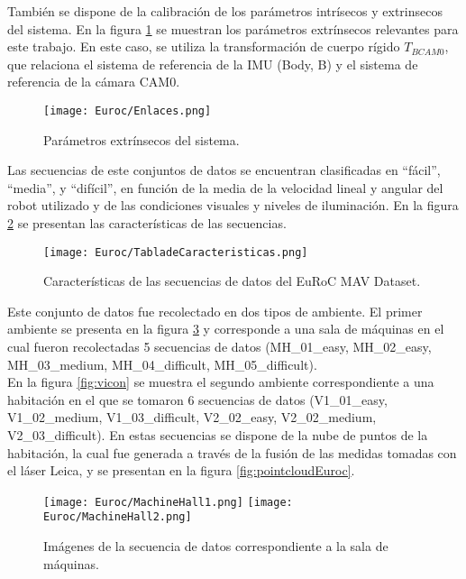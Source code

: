 También se dispone de la calibración de los parámetros intrísecos y extrinsecos del sistema. En la figura \ref{fig:extrinsecosEuroc} se muestran los parámetros extrínsecos relevantes para este trabajo. En este caso, se utiliza la transformación de cuerpo rígido $T_{BCAM0}$, que relaciona el sistema de referencia de la IMU (Body, B) y el sistema de referencia de la cámara CAM0. 



\begin{figure}[H]
	\centering
	\texttt{[image: Euroc/Enlaces.png]}
	\caption[Parámetros extrínsecos del sistema]{Parámetros extrínsecos del sistema.}
	\label{fig:extrinsecosEuroc}
\end{figure}

Las secuencias de este conjuntos de datos se encuentran clasificadas en ``fácil'', ``media'', y ``difícil'',  en función de la media de la velocidad lineal y angular del robot utilizado y de las condiciones visuales y niveles de iluminación. En la figura \ref{fig:tablaDeCaracteristicas} se presentan las características de las secuencias. 

\begin{figure}[H]
	\centering
	\texttt{[image: Euroc/TabladeCaracteristicas.png]}
	\caption[Características de las secuencias de datos del EuRoC MAV Dataset]{Características de las secuencias de datos del EuRoC MAV Dataset.}
	\label{fig:tablaDeCaracteristicas}
\end{figure}



Este conjunto de datos fue recolectado en dos tipos de ambiente. El primer ambiente se presenta en la figura \ref{fig:machineHall} y  corresponde a una sala de máquinas en el cual fueron recolectadas 5 secuencias de datos (MH\_01\_easy, MH\_02\_easy, MH\_03\_medium, MH\_04\_difficult, MH\_05\_difficult). \\

En la figura \ref{fig:vicon} se muestra el segundo ambiente correspondiente a una habitación en el que se tomaron 6 secuencias de datos (V1\_01\_easy, V1\_02\_medium, V1\_03\_difficult, V2\_02\_easy, V2\_02\_medium, V2\_03\_difficult). En estas secuencias se dispone de la nube de puntos de la habitación, la cual fue generada a través de la fusión de las medidas tomadas con el láser Leica, y se presentan en la figura \ref{fig:pointcloudEuroc}.\\

\begin{figure}[H]
	\centering
	\texttt{[image: Euroc/MachineHall1.png]}
	\texttt{[image: Euroc/MachineHall2.png]}
	\caption[Imágenes de la secuencia de datos correspondiente a la sala de máquinas]{Imágenes de la secuencia de datos correspondiente a la sala de máquinas.}
	\label{fig:machineHall}
\end{figure}


